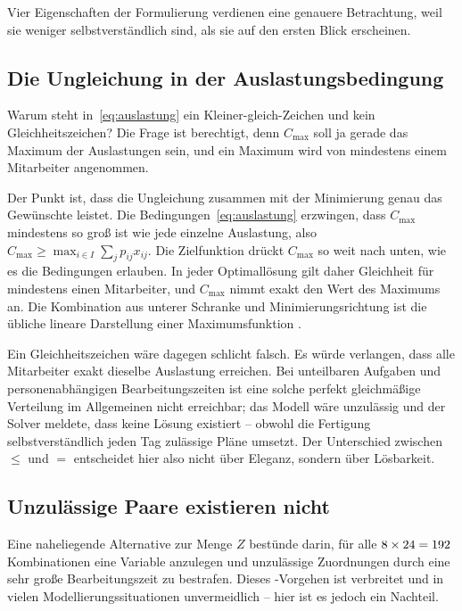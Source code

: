 Vier Eigenschaften der Formulierung verdienen eine genauere Betrachtung, weil sie
weniger selbstverständlich sind, als sie auf den ersten Blick erscheinen.

\subsection*{Die Ungleichung in der Auslastungsbedingung}

Warum steht in~\eqref{eq:auslastung} ein Kleiner-gleich-Zeichen und kein
Gleichheitszeichen? Die Frage ist berechtigt, denn $C_{\max}$ soll ja gerade das
Maximum der Auslastungen sein, und ein Maximum wird von mindestens einem
Mitarbeiter angenommen.

Der Punkt ist, dass die Ungleichung zusammen mit der Minimierung genau das
Gewünschte leistet. Die Bedingungen~\eqref{eq:auslastung} erzwingen, dass
$C_{\max}$ mindestens so groß ist wie jede einzelne Auslastung, also
$C_{\max} \geq \max_{i \in I} \sum_{j} p_{ij} x_{ij}$. Die Zielfunktion drückt
$C_{\max}$ so weit nach unten, wie es die Bedingungen erlauben. In jeder
Optimallösung gilt daher Gleichheit für mindestens einen Mitarbeiter, und
$C_{\max}$ nimmt exakt den Wert des Maximums an. Die Kombination aus unterer
Schranke und Minimierungsrichtung ist die übliche lineare Darstellung einer
Maximumsfunktion \parencite{wolsey2020integer}.

Ein Gleichheitszeichen wäre dagegen schlicht falsch. Es würde verlangen, dass
alle \ZahlMitarbeiter{} Mitarbeiter exakt dieselbe Auslastung erreichen. Bei
unteilbaren Aufgaben und personenabhängigen Bearbeitungszeiten ist eine solche
perfekt gleichmäßige Verteilung im Allgemeinen nicht erreichbar; das Modell wäre
unzulässig und der Solver meldete, dass keine Lösung existiert -- obwohl die
Fertigung selbstverständlich jeden Tag zulässige Pläne umsetzt. Der Unterschied
zwischen $\leq$ und $=$ entscheidet hier also nicht über Eleganz, sondern über
Lösbarkeit.

\subsection*{Unzulässige Paare existieren nicht}

Eine naheliegende Alternative zur Menge $Z$ bestünde darin, für alle
$8{} \times 24{} = 192$ Kombinationen eine Variable
anzulegen und unzulässige Zuordnungen durch eine sehr große Bearbeitungszeit zu
bestrafen. Dieses -Vorgehen ist verbreitet und in vielen
Modellierungssituationen unvermeidlich -- hier ist es jedoch ein Nachteil.

